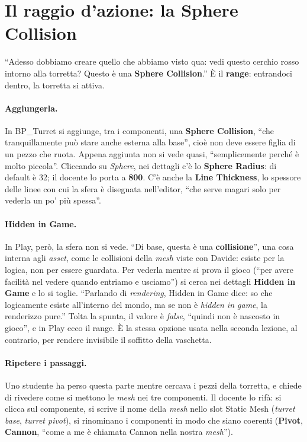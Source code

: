 \section{Il raggio d'azione: la Sphere Collision}
\label{ue4:sec:sfera}

``Adesso dobbiamo creare quello che abbiamo visto qua: vedi questo cerchio rosso intorno
alla torretta? Questo è una \textbf{Sphere Collision}.'' È il \textbf{range}: entrandoci
dentro, la torretta si attiva.

\paragraph{Aggiungerla.} In BP\_Turret si aggiunge, tra i componenti, una
\textbf{Sphere Collision}, ``che tranquillamente può stare anche esterna alla base'',
cioè non deve essere figlia di un pezzo che ruota. Appena aggiunta non si vede quasi,
``semplicemente perché è molto piccola''. Cliccando su \emph{Sphere}, nei dettagli c'è
lo \textbf{Sphere Radius}: di default è 32; il docente lo porta a \textbf{800}. C'è anche
la \textbf{Line Thickness}, lo spessore delle linee con cui la sfera è disegnata
nell'editor, ``che serve magari solo per vederla un po' più spessa''.

\paragraph{Hidden in Game.} In Play, però, la sfera non si vede. ``Di base, questa è una
\textbf{collisione}'', una cosa interna agli \emph{asset}, come le collisioni della
\emph{mesh} viste con Davide: esiste per la logica, non per essere guardata. Per
vederla mentre si prova il gioco (``per avere facilità nel vedere quando entriamo e
usciamo'') si cerca nei dettagli \textbf{Hidden in Game} e lo si toglie. ``Parlando di
\emph{rendering}, Hidden in Game dice: so che logicamente esiste all'interno del mondo,
ma se non è \emph{hidden in game}, la renderizzo pure.'' Tolta la spunta, il valore è
\emph{false}, ``quindi non è nascosto in gioco'', e in Play ecco il range. È la stessa
opzione usata nella seconda lezione, al contrario, per rendere invisibile il soffitto
della vaschetta.

\paragraph{Ripetere i passaggi.} Uno studente ha perso questa parte mentre cercava i
pezzi della torretta, e chiede di rivedere come si mettono le \emph{mesh} nei tre
componenti. Il docente lo rifà: si clicca sul componente, si scrive il nome della
\emph{mesh} nello slot Static Mesh (\emph{turret base}, \emph{turret pivot}), si
rinominano i componenti in modo che siano coerenti (\textbf{Pivot}, \textbf{Cannon},
``come a me è chiamata Cannon nella nostra \emph{mesh}'').

